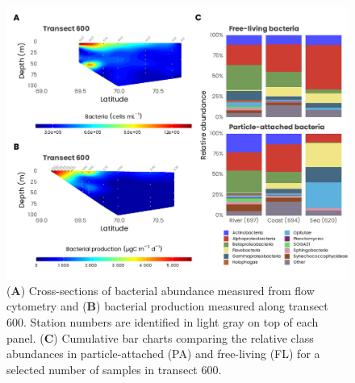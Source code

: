 \documentclass[essd, manuscript]{copernicus}
\begin{document}
\clearpage

\begin{figure}[H]
    \centering
    \includegraphics[scale = 1]{../../../graphs/fig15.pdf}
    \caption{(\textbf{A}) Cross-sections of bacterial abundance measured from flow cytometry and (\textbf{B}) bacterial production measured along transect 600. Station numbers are identified in light gray on top of each panel. (\textbf{C}) Cumulative bar charts comparing the relative class abundances in particle-attached (PA) and free-living (FL) for a selected number of samples in transect 600.}
\end{figure}

\clearpage



\appendix

\noappendix       %



\end{document}
